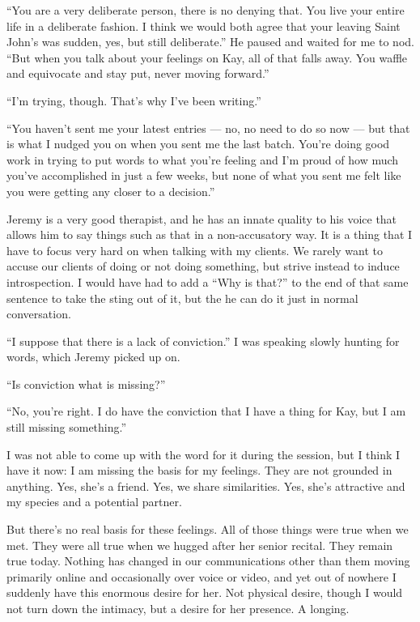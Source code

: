 ``You are a very deliberate person, there is no denying that. You live your entire life in a deliberate fashion. I think we would both agree that your leaving Saint John's was sudden, yes, but still deliberate.'' He paused and waited for me to nod. ``But when you talk about your feelings on Kay, all of that falls away. You waffle and equivocate and stay put, never moving forward.''

``I'm trying, though. That's why I've been writing.''

``You haven't sent me your latest entries --- no, no need to do so now --- but that is what I nudged you on when you sent me the last batch. You're doing good work in trying to put words to what you're feeling and I'm proud of how much you've accomplished in just a few weeks, but none of what you sent me felt like you were getting any closer to a decision.''

Jeremy is a very good therapist, and he has an innate quality to his voice that allows him to say things such as that in a non-accusatory way. It is a thing that I have to focus very hard on when talking with my clients. We rarely want to accuse our clients of doing or not doing something, but strive instead to induce introspection. I would have had to add a ``Why is that?'' to the end of that same sentence to take the sting out of it, but the he can do it just in normal conversation.

``I suppose that there is a lack of conviction.'' I was speaking slowly hunting for words, which Jeremy picked up on.

``Is conviction what is missing?''

``No, you're right. I do have the conviction that I have a thing for Kay, but I am still missing something.''

I was not able to come up with the word for it during the session, but I think I have it now: I am missing the basis for my feelings. They are not grounded in anything. Yes, she's a friend. Yes, we share similarities. Yes, she's attractive and my species and a potential partner.

But there's no real basis for these feelings. All of those things were true when we met. They were all true when we hugged after her senior recital. They remain true today. Nothing has changed in our communications other than them moving primarily online and occasionally over voice or video, and yet out of nowhere I suddenly have this enormous desire for her. Not physical desire, though I would not turn down the intimacy, but a desire for her presence. A longing.

